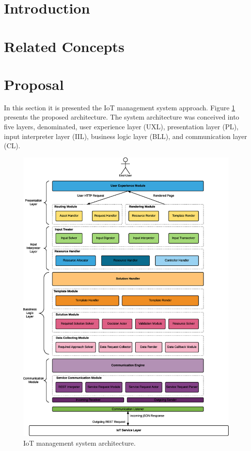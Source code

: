 \documentclass[3p,times]{elsarticle}
\begin{document}
\section{Introduction}
\label{introduction}

\section{Related Concepts} %
\label{related_concepts}

\section{Proposal}
\label{proposal}

In this section it is presented the IoT management system approach. 
Figure \ref{fig_system_architecture} presents the proposed architecture.
The system architecture was conceived into five layers, denominated, user experience layer (UXL), 
presentation layer (PL), input interpreter layer (IIL), business logic layer (BLL), and communication layer (CL).

\begin{figure}[!ht]
	\centering
	\includegraphics[scale=0.25]{composite_que_quiser.eps}
	\caption{IoT management system architecture.}
	\label{fig_system_architecture}
\end{figure}
\end{document}
